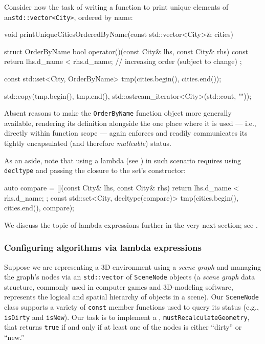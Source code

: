 \noindent Consider now the task of writing a function to print unique elements of
an\linebreak[4] \lstinline!std::vector<City>!, ordered by name:

\begin{emcppslisting}[language=C++]
void printUniqueCitiesOrderedByName(const std::vector<City>& cities)
{
    struct OrderByName
    {
        bool operator()(const City& lhs, const City& rhs) const
        {
            return lhs.d_name < rhs.d_name;
                // increasing order (subject to change)
        }
    };

    const std::set<City, OrderByName> tmp(cities.begin(), cities.end());

    std::copy(tmp.begin(), tmp.end(),
              std::ostream_iterator<City>(std::cout, "\n"));
}
\end{emcppslisting}
    
\noindent Absent reasons to make the \lstinline!OrderByName!
function object more generally available, rendering its definition
alongside the one place where it is used --- i.e., directly within
function scope --- again enforces and readily communicates its tightly
encapsulated (and therefore \emph{malleable}) status. 

As an aside, note that using a lambda (see ) in such scenario requires using \lstinline!decltype! and passing the closure to the set's constructor:
\begin{emcppslisting}[language=C++]
auto compare = [](const City& lhs, const City& rhs) {
    return lhs.d_name < rhs.d_name;
};
const std::set<City, decltype(compare)>
    tmp(cities.begin(), cities.end(), compare);
\end{emcppslisting}

\noindent We discuss the topic of lambda expressions further in the very next section; see .

\subsubsection[Configuring algorithms via lambda expressions]{Configuring algorithms via lambda expressions}\label{configuring-algorithms-via-lambda-expressions}

Suppose we are representing a 3D environment using a \emph{scene
graph} and managing
the graph's nodes via an \lstinline!std::vector! of \lstinline!SceneNode!
objects (a \emph{scene graph} data structure, commonly
used in computer games and 3D-modeling software, represents the
  logical and spatial hierarchy of objects in a scene). Our \lstinline!SceneNode! class supports a variety of
\lstinline!const! member functions used to query its status (e.g.,
\lstinline!isDirty! and \lstinline!isNew!). Our task is to implement a
, \lstinline!mustRecalculateGeometry!, that
returns \lstinline!true! if and only if at least one of the nodes is either
``dirty'' or ``new.''

